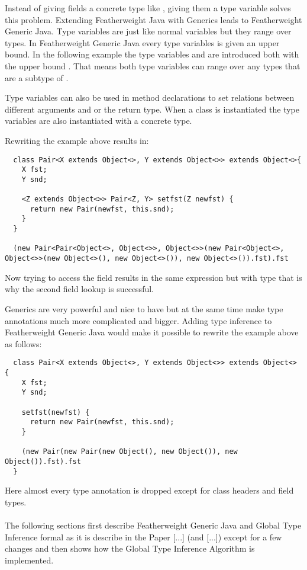 Instead of giving fields a concrete type like , giving them a type variable solves this problem.
Extending Featherweight Java with Generics leads to Featherweight Generic Java.
Type variables are just like normal variables but they range over types. In Featherweight Generic Java every type variables is given an upper bound.
In the following example the type variables  and  are introduced both with the upper bound .
That means both type variables can range over any types that are a subtype of .

Type variables can also be used in method declarations to set relations between different arguments and or the return type.
When a class is instantiated the type variables are also instantiated with a concrete type.

Rewriting the example above results in:

\begin{verbatim}
  class Pair<X extends Object<>, Y extends Object<>> extends Object<>{
    X fst;
    Y snd;

    <Z extends Object<>> Pair<Z, Y> setfst(Z newfst) {
      return new Pair(newfst, this.snd);
    }
  }

  (new Pair<Pair<Object<>, Object<>>, Object<>>(new Pair<Object<>, Object<>>(new Object<>(), new Object<>()), new Object<>()).fst).fst
\end{verbatim}

Now trying to access the field  results in the same expression but with type  that is why the second field lookup is successful.

Generics are very powerful and nice to have but at the same time make type annotations much more complicated and bigger.
Adding type inference to Featherweight Generic Java would make it possible to rewrite the example above as follows:

\begin{verbatim}
  class Pair<X extends Object<>, Y extends Object<>> extends Object<> {
    X fst;
    Y snd;

    setfst(newfst) {
      return new Pair(newfst, this.snd);
    }

    (new Pair(new Pair(new Object(), new Object()), new Object()).fst).fst
  }
\end{verbatim}

Here almost every type annotation is dropped except for class headers and field types.
\\
\\
The following sections first describe Featherweight Generic Java and Global Type Inference formal as it is describe in the Paper [...] (and [...]) except for a few changes and then shows how the Global Type Inference Algorithm is implemented.
